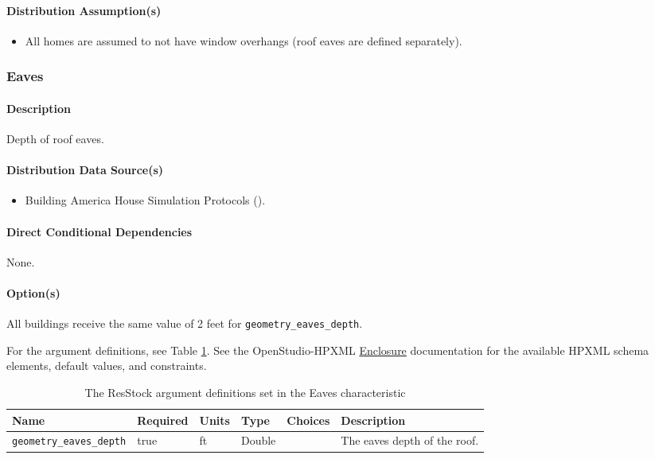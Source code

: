 \paragraph{Distribution Assumption(s)}
\begin{itemize}
\item
  All homes are assumed to not have window overhangs (roof eaves are defined separately).
\end{itemize}

\subsubsection{Eaves}\label{eaves}
\paragraph{Description}
Depth of roof eaves.
\paragraph{Distribution Data Source(s)}
\begin{itemize}
 
\item
  Building America House Simulation Protocols (\cite{Wilson2014}). 
\end{itemize}
\paragraph{Direct Conditional Dependencies}


None.

\paragraph{Option(s)}

All buildings receive the same value of 2 feet for \texttt{geometry\_eaves\_depth}. 


For the argument definitions, see Table \ref{table:hc_arg_def_eaves}. See the OpenStudio-HPXML \href{https://openstudio-hpxml.readthedocs.io/en/v1.8.1/workflow_inputs.html#hpxml-enclosure}{Enclosure} documentation for the available HPXML schema elements, default values, and constraints.
\begin{longtable}[]{|p{4.5cm}|p{1.1cm}|p{}|p{1.1cm}|p{1.1cm}|p{4.5cm}|} \caption{The ResStock argument definitions set in the Eaves characteristic} \label{table:hc_arg_def_eaves} \\

\toprule\noalign{}
Name & Required & Units & Type & Choices & Description \\
\midrule\noalign{}
\endhead
\bottomrule\noalign{}
\endlastfoot
\texttt{geometry\_eaves\_depth} & true & ft & Double & & The eaves depth
of the roof. \\
\end{longtable}
